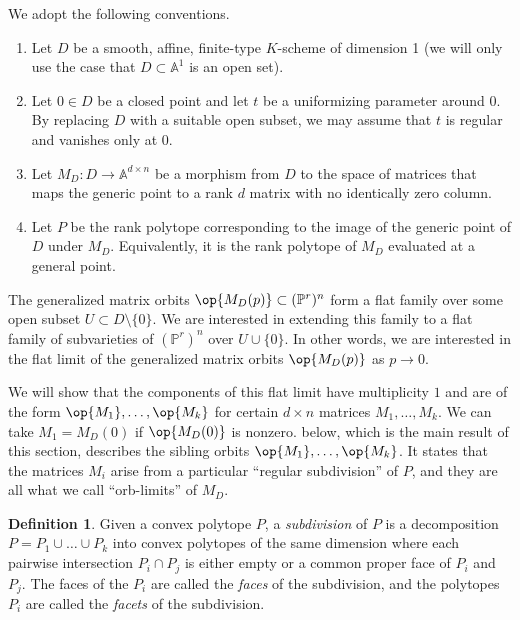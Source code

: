 \documentclass[12pt]{amsart}
\newcommand{\mb}{\mathbb}
\theoremstyle{plain}
\theoremstyle{definition}
\newtheorem{Def}{Definition}[section]
\theoremstyle{remark}
\begin{document}
We adopt the following conventions.
\begin{enumerate}
\item
Let $D$ be a smooth, affine, finite-type $K$-scheme of dimension 1 (we will only use the case that $D\subset \mb{A}^1$ is an open set).
\item
Let $0\in D$ be a closed point and let $t$ be a uniformizing parameter around 0. By replacing $D$ with a suitable open subset, we may assume that $t$ is regular and vanishes only at $0$.
\item Let $M_D: D\to \mb{A}^{d\times n}$ be a morphism from $D$ to the space of matrices that maps the generic point to a rank $d$ matrix with no identically zero column.
\item
Let $P$ be the rank polytope corresponding to the image of the generic point of $D$ under $M_D$. Equivalently, it is the rank polytope of $M_D$ evaluated at a general point.
\end{enumerate}

The generalized matrix orbits $\op{M_D(p)} \subset (\mb{P}^r)^n$ form a flat family over some open subset $U \subset D\setminus \{0\}$. We are interested in extending this family to a flat family of subvarieties of $(\mb{P}^r)^n$ over $U \cup \{0\}$. In other words, we are interested in the flat limit of the generalized matrix orbits $\op{M_D(p)}$ as $p \to 0$.

We will show that the components of this flat limit have multiplicity $1$ and are of the form $\op{M_1}, \ldots, \op{M_k}$ for certain $d\times n$ matrices $M_1, \ldots, M_k$. We can take $M_1 =M_D(0)$ if $\op{M_D(0)}$ is nonzero.  below, which is the main result of this section, describes the sibling orbits $\op{M_1}, \ldots, \op{M_k}$. It states that the matrices $M_i$ arise from a particular ``regular subdivision'' of $P$, and they are all what we call ``orb-limits'' of $M_D$. 

\begin{Def}
Given a convex polytope $P$, a \emph{subdivision} of $P$ is a decomposition $P=P_1 \cup \ldots \cup P_k$ into convex polytopes of the same dimension where each pairwise intersection $P_i \cap P_j$ is either empty or a common proper face of $P_i$ and $P_j$. The faces of the $P_i$ are called the \emph{faces} of the subdivision, and the polytopes $P_i$ are called the \emph{facets} of the subdivision.
\end{Def}
\end{document}
